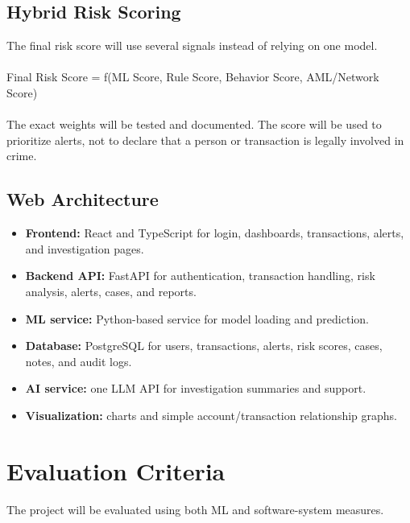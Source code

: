 \documentclass[11pt,a4paper]{article}
\begin{document}
\subsection{Hybrid Risk Scoring}
The final risk score will use several signals instead of relying on one model.
\\
\\
Final Risk Score = f(ML Score, Rule Score, Behavior Score, AML/Network Score)
\\
\\
The exact weights will be tested and documented. The score will be used to prioritize
alerts, not to declare that a person or transaction is legally involved in crime.


\subsection{Web Architecture}
\begin{itemize}[leftmargin=0.7cm]
    \item \textbf {Frontend:} React and TypeScript for login, dashboards, transactions, alerts, and
investigation pages.
    \item \textbf {Backend API:} FastAPI for authentication, transaction handling, risk analysis, alerts,
cases, and reports.
    \item \textbf {ML service:} Python-based service for model loading and prediction.
    \item \textbf {Database:} PostgreSQL for users, transactions, alerts, risk scores, cases, notes, and
audit logs.
    \item \textbf {AI service:} one LLM API for investigation summaries and support.
    \item \textbf {Visualization:} charts and simple account/transaction relationship graphs.
\end{itemize}

\section{Evaluation Criteria }
The project will be evaluated using both ML and software-system measures.
\end{document}
